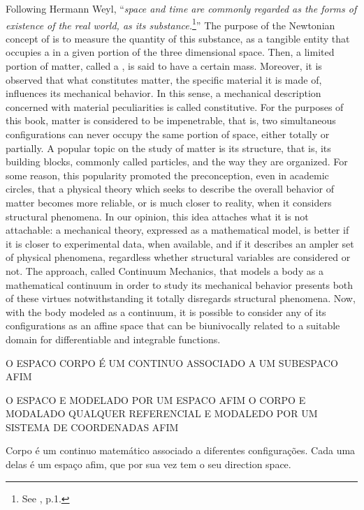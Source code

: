 Following Hermann Weyl, ``\emph{space and time are commonly regarded as the forms of existence of the real world,  as its substance.}\footnote{See \cite{weyl_1952_2}, p.1.}'' The purpose of the Newtonian concept of  is to measure the quantity of this substance, as a tangible entity that occupies a  in a given portion of the three dimensional space. Then, a limited portion of matter, called a , is said to have a certain mass. Moreover, it is observed that what constitutes matter, the specific material it is made of, influences its mechanical behavior. In this sense, a mechanical description concerned with material peculiarities is called constitutive. For the purposes of this book, matter is considered to be impenetrable, that is, two simultaneous configurations can never occupy the same portion of space, either totally or partially. A popular topic on the study of matter is its structure, that is, its building blocks, commonly called particles, and the way they are organized. For some reason, this popularity promoted the preconception, even in academic circles, that a physical theory which seeks to describe the overall behavior of matter becomes more reliable, or is much closer to reality, when it considers structural phenomena. In our opinion, this idea attaches what it is not attachable: a mechanical theory, expressed as a mathematical model, is better if it is closer to experimental data, when available, and if it describes an ampler set of physical phenomena, regardless whether structural variables are considered or not. The approach, called Continuum Mechanics, that models a body as a mathematical continuum in order to study its mechanical behavior presents both of these virtues notwithstanding it totally disregards structural phenomena. Now, with the body modeled as a continuum, it is possible to consider any of its configurations as an affine space that can be biunivocally related to a suitable domain for differentiable and integrable functions.



O ESPACO 
CORPO É UM CONTINUO ASSOCIADO A UM SUBESPACO AFIM 

O ESPACO E MODELADO POR UM ESPACO AFIM
O CORPO E MODALADO 
QUALQUER REFERENCIAL E MODALEDO POR UM SISTEMA DE COORDENADAS AFIM

Corpo é um continuo matemático associado a diferentes configurações. Cada uma delas é um espaço afim, que por sua vez tem o seu direction space.